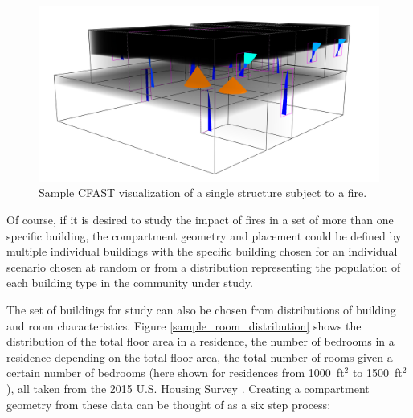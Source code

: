 \documentclass[12pt,twoside]{book}
\begin{document}
\begin{figure}[h!]
\centering
\includegraphics[width=4.5in]{FIGURES/Sample_Visualization.png}
\caption{Sample CFAST visualization of a single structure subject to a fire.}
\label{sample_visualization}
\end{figure}

Of course, if it is desired to study the impact of fires in a set of more than one specific building, the compartment geometry and placement could be defined by multiple individual buildings with the specific building chosen for an individual scenario chosen at random or from a distribution representing the population of each building type in the community under study.

The set of buildings for study can also be chosen from distributions of building and room characteristics. Figure \ref{sample_room_distribution} shows the distribution of the total floor area in a residence, the number of bedrooms in a residence depending on the total floor area, the total number of rooms given a certain number of bedrooms (here shown for residences from 1000~ft$^2$ to 1500~ft$^2$), all taken from the 2015 U.S. Housing Survey \cite{AHS2015}. Creating a compartment geometry from these data can be thought of as a six step process:
\end{document}
